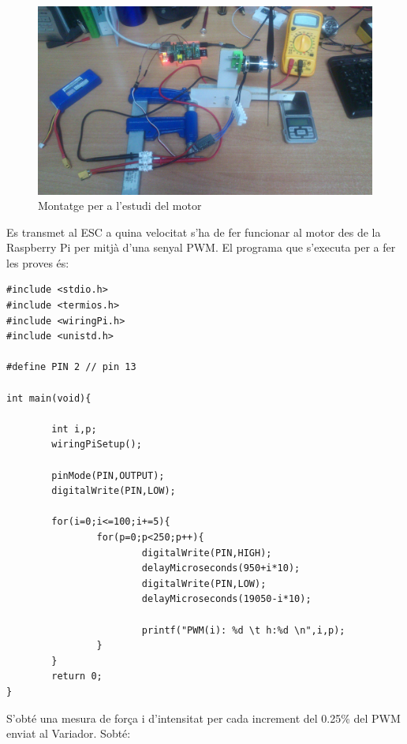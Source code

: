 \documentclass[twoside]{article}
\begin{document}
\begin{figure}[h!]
\begin{center}
\includegraphics[scale=0.09]{images/montaje.jpg}
\caption{Montatge per a l'estudi del motor}
\end{center}
\end{figure}

Es transmet al ESC a quina velocitat s'ha de fer funcionar al motor des de la Raspberry Pi per mitjà d'una senyal PWM. El programa que s'executa per a fer les proves és:

\begin{verbatim}
#include <stdio.h>
#include <termios.h>
#include <wiringPi.h>
#include <unistd.h>

#define PIN 2 // pin 13

int main(void){

        int i,p;
        wiringPiSetup();

        pinMode(PIN,OUTPUT);
        digitalWrite(PIN,LOW);

        for(i=0;i<=100;i+=5){
                for(p=0;p<250;p++){
                        digitalWrite(PIN,HIGH);
                        delayMicroseconds(950+i*10);
                        digitalWrite(PIN,LOW);
                        delayMicroseconds(19050-i*10);

                        printf("PWM(i): %d \t h:%d \n",i,p);
                }
        }
        return 0;
}
\end{verbatim}

S'obté una mesura de força i d'intensitat per cada increment del 0.25\% del PWM enviat al Variador. Sobté:
\end{document}

